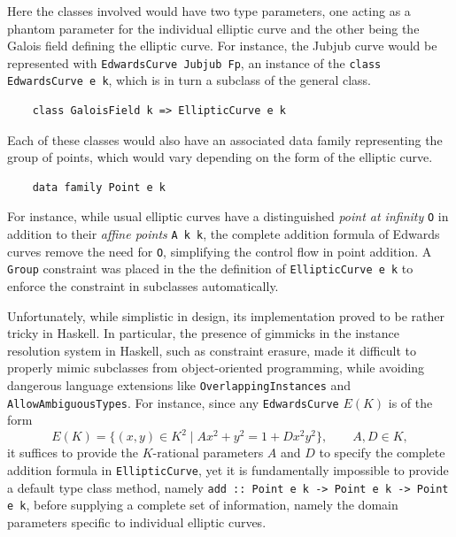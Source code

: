 \documentclass[11pt]{article}
\begin{document}
Here the classes involved would have two type parameters, one acting as a phantom parameter for the individual elliptic curve and the other being the Galois field defining the elliptic curve. For instance, the Jubjub curve would be represented with \texttt{EdwardsCurve Jubjub Fp}, an instance of the \texttt{class EdwardsCurve e k}, which is in turn a subclass of the general class.
\begin{verbatim}
    class GaloisField k => EllipticCurve e k
\end{verbatim}
Each of these classes would also have an associated data family representing the group of points, which would vary depending on the form of the elliptic curve.
\begin{verbatim}
    data family Point e k
\end{verbatim}
For instance, while usual elliptic curves have a distinguished \emph{point at infinity} \texttt{O} in addition to their \emph{affine points} \texttt{A k k}, the complete addition formula of Edwards curves remove the need for \texttt{O}, simplifying the control flow in point addition. A \texttt{Group} constraint was placed in the the definition of \texttt{EllipticCurve e k} to enforce the constraint in subclasses automatically.

Unfortunately, while simplistic in design, its implementation proved to be rather tricky in Haskell. In particular, the presence of gimmicks in the instance resolution system in Haskell, such as constraint erasure, made it difficult to properly mimic subclasses from object-oriented programming, while avoiding dangerous language extensions like \texttt{OverlappingInstances} and \texttt{AllowAmbiguousTypes}. For instance, since any \texttt{EdwardsCurve} $ E(K) $ is of the form
$$ E(K) = \{ (x, y) \in K^2 \mid Ax^2 + y^2 = 1 + Dx^2y^2 \}, \qquad A, D \in K, $$
it suffices to provide the $ K $-rational parameters $ A $ and $ D $ to specify the complete addition formula in \texttt{EllipticCurve}, yet it is fundamentally impossible to provide a default type class method, namely \texttt{add :: Point e k -> Point e k -> Point e k}, before supplying a complete set of information, namely the domain parameters specific to individual elliptic curves.
\end{document}
